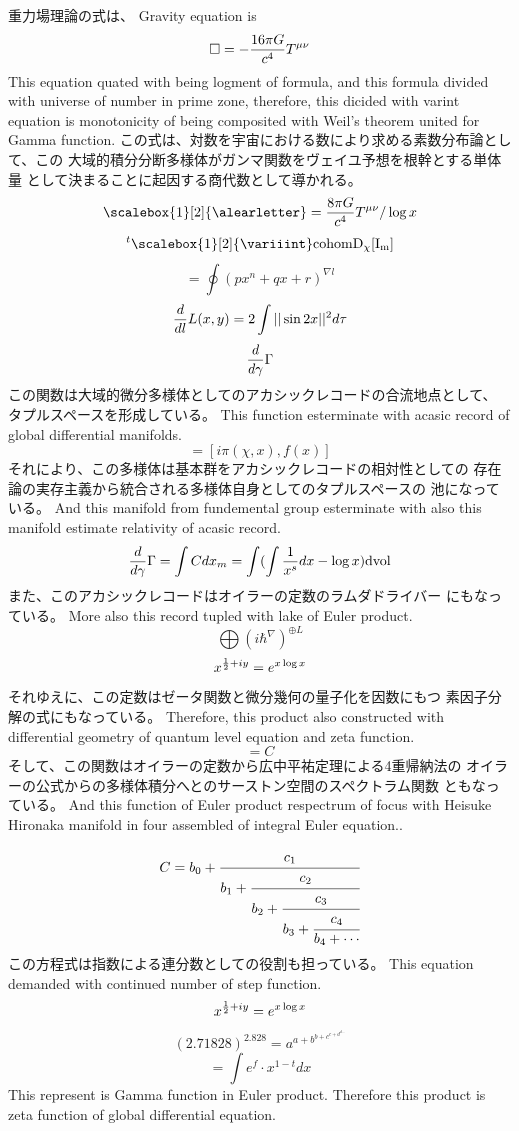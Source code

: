 \documentclass{jsarticle}
\begin{document}
{ 重力場理論の式は、
  Gravity equation is
  $$ \square = - {16 \pi G \over c^4}T^{\mu\nu} $$
  This equation quated with being logment of formula, and
  this formula divided with universe of number in prime zone,
  therefore, this dicided with varint equation is monotonicity of
  being composited with Weil's theorem united for Gamma function.
  この式は、対数を宇宙における数により求める素数分布論として、この
  大域的積分分断多様体がガンマ関数をヴェイユ予想を根幹とする単体量
  として決まることに起因する商代数として導かれる。
  $$ \scalebox{1}[2]{\alearletter} = 
  {{{{8 \pi G} \over {c^4}}T^{\mu\nu}}/ \log x} $$
  $$ {}^{t}\scalebox{1}[2]{\variiint}\mathrm{cohom D_{\chi}[I_m]}$$
  $$ = \oint {(px^n + qx + r)^{\nabla l}} $$
  $$ {d \over d l}L(x,y) = 2 \int ||\sin 2x||^{2}d \tau $$
  $$ {d \over d \gamma}\Gamma $$
  この関数は大域的微分多様体としてのアカシックレコードの合流地点として、
  タプルスペースを形成している。
  This function esterminate with acasic record of global differential
  manifolds.
  $$ = [i \pi (\chi, x), f(x)] $$
  それにより、この多様体は基本群をアカシックレコードの相対性としての
  存在論の実存主義から統合される多様体自身としてのタプルスペースの
  池になっている。
  And this manifold from fundemental group esterminate with
  also this manifold estimate relativity of acasic record.
  $$ {d \over d \gamma}\Gamma = \int C dx_m = \int(\int {1 \over x^s}dx
  - \log x)\mathrm{dvol} $$
  また、このアカシックレコードはオイラーの定数のラムダドライバー
  にもなっている。
  More also this record tupled with lake of Euler product.
  $$ \bigoplus({i \hbar^{\nabla}})^{\oplus L} $$
  $$ x^{{1 \over 2} + iy} = e^{x \log x} $$
  それゆえに、この定数はゼータ関数と微分幾何の量子化を因数にもつ
  素因子分解の式にもなっている。
  Therefore, this product also constructed with differential geometry
  of quantum level equation and zeta function.
  $$ = C $$ 
  そして、この関数はオイラーの定数から広中平祐定理による4重帰納法の
  オイラーの公式からの多様体積分へとのサーストン空間のスペクトラム関数
  ともなっている。
  And this function of Euler product respectrum of focus with
  Heisuke Hironaka manifold in four assembled of integral Euler equation.. 

  $$ C =  b_0 + \cfrac{c_1}{b_1 +
	  \cfrac{c_2}{b_2 +
	  \cfrac{c_3}{b_3 +
	  \cfrac{c_4}{b_4 + \cdots}}}} $$
  この方程式は指数による連分数としての役割も担っている。  
  This equation demanded with continued number of step function.
  $$ x^{{1 \over 2} + iy} = e^{x \log x} $$
  $$ (2.71828)^{2.828} = a^{a + b^{b + c^{c + d^{d \cdots }}}} $$
  $$ = \int e^f \cdot x^{1 - t}dx $$
  This represent is Gamma function in Euler product.
  Therefore this product is zeta function of global differential equation.

}
\end{document}
